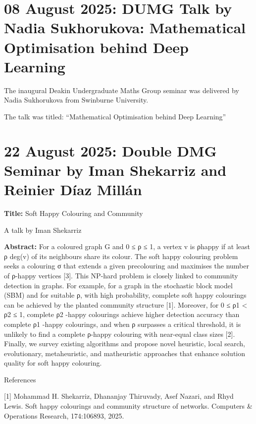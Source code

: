 \documentclass[10pt,twoside,a5paper]{scrreprt}
\begin{document}
  \section*{08 August 2025: DUMG Talk by Nadia Sukhorukova:
  Mathematical Optimisation behind Deep Learning}

  The inaugural Deakin Undergraduate Maths Group seminar was delivered  by
  Nadia Sukhorukova from Swinburne University.

The talk was   titled: ``Mathematical Optimisation behind Deep Learning''

  \section*{22 August 2025: Double DMG Seminar by Iman Shekarriz and
  Reinier Díaz Millán}

  \textbf{Title:} Soft Happy Colouring and Community

  A talk by Iman Shekarriz

  \textbf{Abstract:} For a coloured graph G and 0 ≤ ρ ≤ 1, a vertex v is
  ρhappy if at least ρ deg(v) of its neighbours share its colour. The
  soft happy colouring problem seeks a colouring σ that extends a given
  precolouring and maximises the number of ρ-happy vertices {[}3{]}.
  This NP-hard problem is closely linked to community detection in
  graphs. For example, for a graph in the stochastic block model (SBM)
  and for suitable ρ, with high probability, complete soft happy
  colourings can be achieved by the planted community structure {[}1{]}.
  Moreover, for 0 ≤ ρ1 \textless{} ρ2 ≤ 1, complete ρ2 -happy colourings
  achieve higher detection accuracy than complete ρ1 -happy colourings,
  and when ρ surpasses a critical threshold, it is unlikely to find a
  complete ρ-happy colouring with near-equal class sizes {[}2{]}.
  Finally, we survey existing algorithms and propose novel heuristic,
  local search, evolutionary, metaheuristic, and matheuristic approaches
  that enhance solution quality for soft happy colouring.

  References

  [1] Mohammad H. Shekarriz, Dhananjay Thiruvady, Asef
  Nazari, and Rhyd Lewis. Soft happy colourings and community structure
  of networks. Computers \& Operations Research, 174:106893, 2025.
\end{document}
